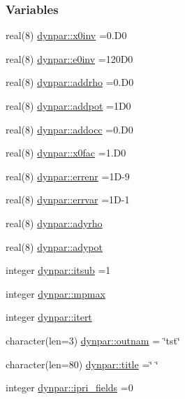 \subsubsection*{Variables}
\begin{DoxyCompactItemize}
\item 
real(8) \hyperlink{namespacedynpar_a57dd802430450aea66e77f67862b706d}{dynpar\+::x0inv} =0.\+D0
\item 
real(8) \hyperlink{namespacedynpar_adb20e834bea1f9c5916b6dcf71117310}{dynpar\+::e0inv} =120\+D0
\item 
real(8) \hyperlink{namespacedynpar_a786b46b00f5bc2733ee8a333f402c8b8}{dynpar\+::addrho} =0.\+D0
\item 
real(8) \hyperlink{namespacedynpar_a471b6f8327d73d0d3fcfb99a045c4db4}{dynpar\+::addpot} =1\+D0
\item 
real(8) \hyperlink{namespacedynpar_a7bce766adffe727e6e87f70e5ef9f56f}{dynpar\+::addocc} =0.\+D0
\item 
real(8) \hyperlink{namespacedynpar_ade319b182a5cf3eeb532a266c036e1db}{dynpar\+::x0fac} =1.\+D0
\item 
real(8) \hyperlink{namespacedynpar_a18628c991498b8604535ab88dc8d6138}{dynpar\+::errenr} =1\+D-\/9
\item 
real(8) \hyperlink{namespacedynpar_a75c0e72e8fdd83bcf086d999389b6842}{dynpar\+::errvar} =1\+D-\/1
\item 
real(8) \hyperlink{namespacedynpar_a5df7c9c26d3c19fcaeed23c864679981}{dynpar\+::adyrho}
\item 
real(8) \hyperlink{namespacedynpar_acaa0cf6de41c1f3711fb9a20de59e903}{dynpar\+::adypot}
\item 
integer \hyperlink{namespacedynpar_abb878319b6c5e1ba747ec88b09fe364f}{dynpar\+::itsub} =1
\item 
integer \hyperlink{namespacedynpar_a920d02babff72b0b7d4bc33c4c303c37}{dynpar\+::mpmax}
\item 
integer \hyperlink{namespacedynpar_a5d684c8c5595bd94acfef2e7054d5cb8}{dynpar\+::itert}
\item 
character(len=3) \hyperlink{namespacedynpar_ae8814a4465f746260e5df076c821cc2c}{dynpar\+::outnam} = \char`\"{}tst\char`\"{}
\item 
character(len=80) \hyperlink{namespacedynpar_a8f17285d0a850123850dacf83f3c7ee7}{dynpar\+::title} =\char`\"{} \char`\"{}
\item 
integer \hyperlink{namespacedynpar_a75d1d07f7bc1b403e24ec22b7fae69a9}{dynpar\+::ipri\+\_\+fields} =0
\item 

\end{DoxyCompactItemize}
